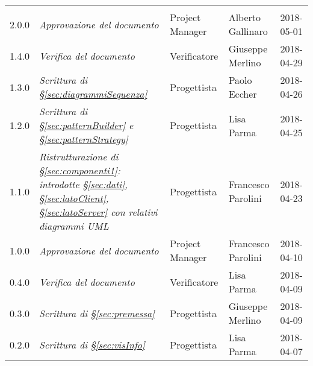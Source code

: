 \newpage 
\section*{}
\begin{table}[H]
	\centering
	\begin{tabular}{C{2cm}|C{4cm}|C{3cm}|C{3cm}|R{2cm}}
		
		 & & & & \\

		2.0.0 & \emph{Approvazione del documento} & Project Manager & Alberto Gallinaro &  2018-05-01 \\
		\hline		
		
		1.4.0 & \emph{Verifica del documento} & Verificatore & Giuseppe Merlino &  2018-04-29 \\
		\hline

		1.3.0 & \emph{Scrittura di §\ref{sec:diagrammiSequenza}} & Progettista & Paolo Eccher &  2018-04-26 \\
		\hline

		1.2.0 & \emph{Scrittura di §\ref{sec:patternBuilder} e §\ref{sec:patternStrategy}} & Progettista & Lisa Parma &  2018-04-25 \\
		\hline

		1.1.0 & \emph{Ristrutturazione di §\ref{sec:componenti1}: introdotte §\ref{sec:dati}, §\ref{sec:latoClient}, §\ref{sec:latoServer} con relativi diagrammi UML} & Progettista & Francesco Parolini &  2018-04-23 \\
		\hline
		

		1.0.0 & \emph{Approvazione del documento} & Project Manager & Francesco Parolini &  2018-04-10 \\
		\hline

		0.4.0 & \emph{Verifica del documento} & Verificatore & Lisa Parma &  2018-04-09 \\
		\hline

		0.3.0 & \emph{Scrittura di §\ref{sec:premessa}} & Progettista & Giuseppe Merlino &  2018-04-09 \\
		\hline

		0.2.0 & \emph{Scrittura di §\ref{sec:visInfo}} & Progettista & Lisa Parma &  2018-04-07 \\
		\hline






\end{tabular}
\end{table}
